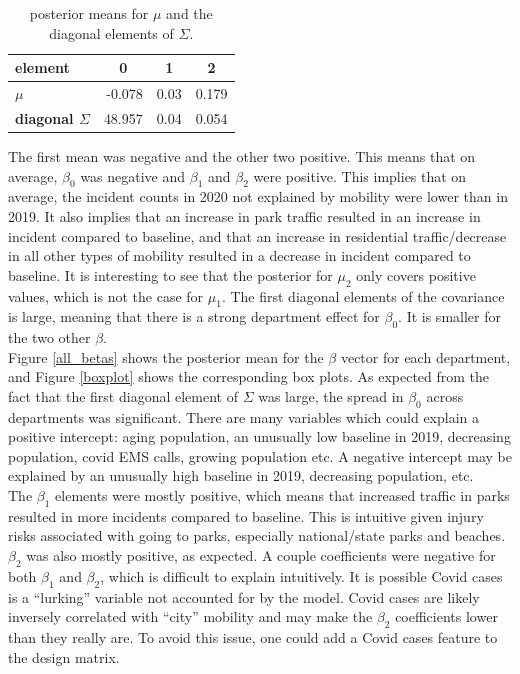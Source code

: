 \documentclass[paper=a4, fontsize=11pt]{scrartcl}
\begin{document}
\begin{table}[!htb]
\centering
\begin{tabular}{|l|r|r|r|}
\hline
\textbf{element}           & \multicolumn{1}{c|}{\textbf{0}} & \multicolumn{1}{c|}{\textbf{1}} & \multicolumn{1}{c|}{\textbf{2}} \\ \hline
\textbf{$\mu$}             & -0.078	& 0.03 &	0.179                          \\ \hline
\textbf{diagonal $\Sigma$} & 48.957	& 0.04 & 	0.054                         \\ \hline

\end{tabular}
\caption{posterior means for $\mu$ and the diagonal elements of $\Sigma$.}
\label{tab2}
\end{table}

The first mean was negative and the other two positive. This means that on average, $\beta_0$ was negative and $\beta_1$  and $\beta_2$ were positive. This implies that on average, the incident counts in 2020 not explained by mobility were lower than in 2019. It also implies that an increase in park traffic resulted in an increase in incident compared to baseline, and that an increase in residential traffic/decrease in all other types of mobility resulted in a decrease in incident compared to baseline.  It is interesting to see that the posterior for $\mu_{2}$ only covers positive values, which is not the case for $\mu_{1}$. The first diagonal elements of the covariance is large, meaning that there is a strong department effect for $\beta_0$. It is smaller for the two other $\beta$. \\

Figure \ref{all_betas} shows the posterior mean for the $\beta$ vector for each department, and Figure \ref{boxplot} shows the corresponding box plots. As expected from the fact that the first diagonal element of $\Sigma$ was large, the spread in $\beta_0$ across departments was significant. There are many variables which could explain a positive intercept: aging population, an unusually low baseline in 2019, decreasing population, covid EMS calls, growing population etc. A negative intercept may be explained by an unusually high baseline in 2019, decreasing population, etc. \\

The $\beta_1$ elements were mostly positive, which means that increased traffic in parks resulted in more incidents compared to baseline. This is intuitive given injury risks associated with going to parks, especially national/state parks and beaches. $\beta_2$ was also mostly positive, as expected. A couple coefficients were negative for both $\beta_1$ and  $\beta_2$, which is difficult to explain intuitively. It is possible Covid cases  is a ``lurking'' variable not accounted for by the model. Covid cases are likely inversely correlated with ``city'' mobility
and may make the $\beta_2$ coefficients lower than they really are.  To avoid this issue, one could add a Covid cases feature to the design matrix.\\
\end{document}
